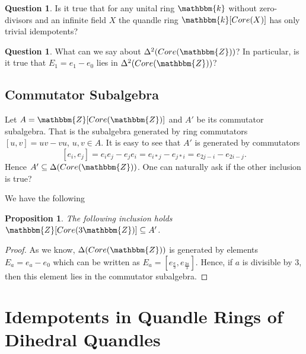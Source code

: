\documentclass[12pt]{amsart}
\newtheorem{pro}[thm]{Proposition}
\theoremstyle{definition}
\newtheorem{qst}[thm]{Question}
\theoremstyle{remark}
\begin{document}
\begin{qst}
Is it true that for any unital ring $\mathbbm {k}$ without zero-divisors  and an infinite field $X$ the quandle ring $\mathbbm {k} [Core(X)]$ has only trivial idempotents?
\end{qst}

\begin{qst}
What can we say about  $\Delta^2(Core(\mathbbm {Z}))$? In particular, is it true that $E_1 = e_1 - e_0$ lies in $\Delta^2(Core(\mathbbm {Z}))$?
\end{qst}


\subsection{Commutator Subalgebra}

Let $A = \mathbbm {Z}[Core(\mathbbm {Z})]$ and $A'$ be its commutator subalgebra. That is the subalgebra generated by ring commutators $[u, v] = u v - v u$, $u, v \in A$. It is easy to see that $A' $ is generated by commutators
$$
[e_i, e_j] = e_i e_j - e_j e_i = e_{i*j} -  e_{j*i} =  e_{2j -i} -  e_{2 i -j}.
$$
Hence $A' \subseteq \Delta(Core(\mathbbm {Z}))$. One can naturally ask if the other %
inclusion is true? 

We have the following

\begin{pro}
The following inclusion holds  $ \mathbbm {Z}[Core(3\mathbbm {Z})]  \subseteq A'$. 
\end{pro}

\begin{proof}
As we know, $\Delta(Core(\mathbbm {Z}))$ is generated by elements $E_a = e_a - e_0$ which can be written as $E_a = [e_{\frac{a}{3}}, e_{\frac{2a}{3}}]$. Hence, if $a$ is divisible by $3$, then this element lies in the commutator subalgebra. 
\end{proof}





\section{Idempotents in Quandle Rings of Dihedral Quandles} \label{Idemp-Dihedral}
\end{document}
